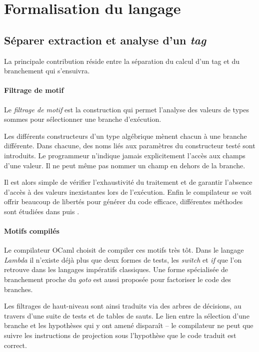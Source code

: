 \section{Formalisation du langage}

\subsection{Séparer extraction et analyse d'un \emph{tag}}

La principale contribution réside entre la séparation du calcul d'un tag et du
branchement qui s'ensuivra.

\paragraph{Filtrage de motif} Le \emph{filtrage de motif} est la construction
qui permet l'analyse des valeurs de types sommes pour sélectionner une branche
d'exécution.

Les différents constructeurs d'un type algébrique mènent chacun à une branche
différente. Dans chacune, des noms liés aux paramètres du constructeur
testé sont introduits. Le programmeur n'indique jamais explicitement l'accès
aux champs d'une valeur. Il ne peut même pas nommer un champ en dehors de la
branche.

Il est alors simple de vérifier l'exhaustivité du traitement et de garantir
l'absence d'accès à des valeurs inexistantes lors de l'exécution. Enfin le
compilateur se voit offrir beaucoup de libertés pour générer du code efficace,
différentes méthodes sont étudiées dans \cite{LeFessant:2001:OPM:507669.507641}
puis \cite{Maranget:2008:CPM:1411304.1411311}.

\paragraph{Motifs compilés} Le compilateur OCaml choisit de compiler ces motifs
très tôt. Dans le langage \emph{Lambda} il n'existe déjà plus que deux formes
de tests, les \emph{switch} et \emph{if} que l'on retrouve dans les langages
impératifs classiques. Une forme spécialisée de branchement proche du
\emph{goto} est aussi proposée pour factoriser le code des branches.

Les filtrages de haut-niveau sont ainsi traduits via des arbres de décisions,
au travers d'une suite de tests et de tables de sauts.  Le lien entre la
sélection d'une branche et les hypothèses qui y ont amené disparaît -- le
compilateur ne peut que suivre les instructions de projection sous l'hypothèse
que le code traduit est correct.

